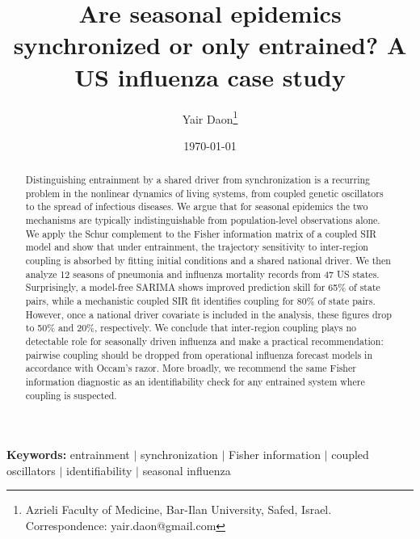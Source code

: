 \documentclass[11pt]{article}
\begin{document}
\title{Are seasonal epidemics synchronized or only entrained? A US influenza case study}

\author{Yair Daon\thanks{Azrieli Faculty of Medicine, Bar-Ilan
    University, Safed, Israel. Correspondence: yair.daon@gmail.com}}

\date{\today}

\maketitle

\begin{abstract}
Distinguishing entrainment by a shared driver from synchronization is
a recurring problem in the nonlinear dynamics of living systems, from
coupled genetic oscillators to the spread of infectious diseases. We
argue that for seasonal epidemics the two mechanisms are typically
indistinguishable from population-level observations alone. We apply
the Schur complement to the Fisher information matrix of a coupled SIR
model and show that under entrainment, the trajectory sensitivity to
inter-region coupling is absorbed by fitting initial conditions and a
shared national driver. We then analyze 12 seasons of pneumonia and
influenza mortality records from 47 US states. Surprisingly, a
model-free SARIMA shows improved prediction skill for 65\% of
state pairs, while a mechanistic coupled SIR fit identifies coupling
for 80\% of state pairs. However, once a national driver covariate is
included in the analysis, these figures drop to 50\% and 20\%,
respectively. We conclude that inter-region coupling plays no
detectable role for seasonally driven influenza and make a practical
recommendation: pairwise coupling should be dropped from operational
influenza forecast models in accordance with Occam's razor.  More
broadly, we recommend the same Fisher information diagnostic as an
identifiability check for any entrained system where coupling is
suspected.
\end{abstract}

\noindent\textbf{Keywords:} entrainment $|$ synchronization $|$
Fisher information $|$ coupled oscillators $|$ identifiability $|$
seasonal influenza
\end{document}
